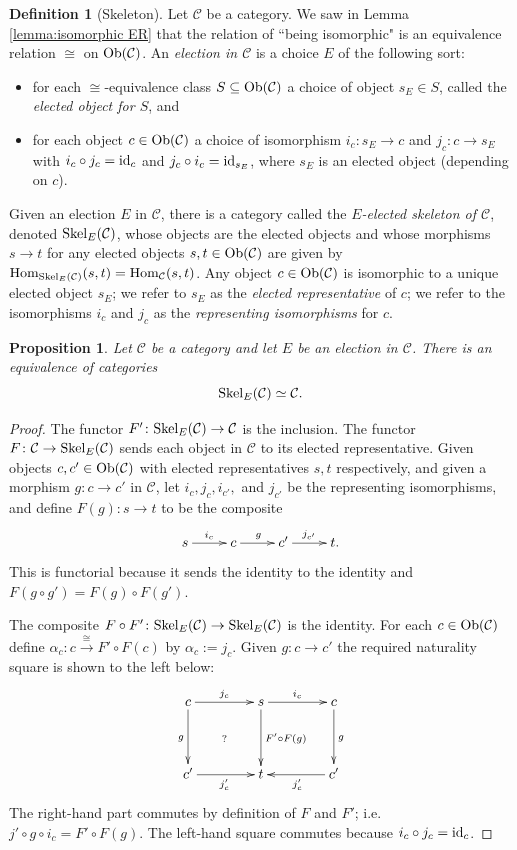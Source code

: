 \documentclass{book}
\def\tn{\textnormal}
\def\mc{\mathcal}
\def\Hom{\tn{Hom}}
\def\Ob{\tn{Ob}}
\def\Skel{\tn{Skel}}
\def\to{\rightarrow}
\def\taking{\colon}
\def\ss{\subseteq}
\def\iso{\cong}
\newcommand{\To}[1]{\xrightarrow{#1}}
\def\id{\tn{id}}
\def\mcC{\mc{C}}
\newtheorem{proposition}[subsubsection]{Proposition}
\theoremstyle{remark}
\theoremstyle{definition}
\newtheorem{definition}[subsubsection]{Definition}
\begin{document}
\begin{definition}[Skeleton]

Let $\mcC$ be a category. We saw in Lemma \ref{lemma:isomorphic ER} that the relation of ``being isomorphic" is an equivalence relation $\cong$ on $\Ob(\mcC)$. An {\em election in $\mcC$} is a choice $E$ of the following sort:
\begin{itemize}
\item for each $\cong$-equivalence class $S\ss\Ob(\mcC)$ a choice of object $s_E\in S$, called the {\em elected object for $S$}, and
\item for each object $c\in\Ob(\mcC)$ a choice of isomorphism $i_c\taking s_E\to c$ and $j_c\taking c\to s_E$ with $i_c\circ j_c=\id_c$ and $j_c\circ i_c=\id_{s_E}$, where $s_E$ is an elected object (depending on $c$).
\end{itemize}
Given an election $E$ in $\mcC$, there is a category called the {\em $E$-elected skeleton of $\mcC$}, denoted $\Skel_E(\mcC)$, whose objects are the elected objects and whose morphisms $s\to t$ for any elected objects $s,t\in\Ob(\mcC)$ are given by $\Hom_{\Skel_E(\mcC)}(s,t)=\Hom_\mcC(s,t)$. Any object $c\in\Ob(\mcC)$ is isomorphic to a unique elected object $s_E$; we refer to $s_E$ as the {\em elected representative} of $c$; we refer to the isomorphisms $i_c$ and $j_c$ as the {\em representing isomorphisms} for $c$.

\end{definition}

\begin{proposition}

Let $\mcC$ be a category and let $E$ be an election in $\mcC$. There is an equivalence of categories $$\Skel_E(\mcC)\simeq\mcC.$$

\end{proposition}

\begin{proof}

The functor $F'\taking\Skel_E(\mcC)\to\mcC$ is the inclusion. The functor $F\taking\mcC\to\Skel_E(\mcC)$ sends each object in $\mcC$ to its elected representative. Given objects $c,c'\in\Ob(\mcC)$ with elected representatives $s,t$ respectively, and given a morphism $g\taking c\to c'$ in $\mcC$, let $i_c,j_c,i_{c'},$ and $j_{c'}$ be the representing isomorphisms, and define $F(g)\taking s\to t$ to be the composite 
$$\xymatrix{s\ar[r]^{i_c}&c\ar[r]^g&c'\ar[r]^{j_{c'}}&t.}$$
This is functorial because it sends the identity to the identity and $F(g\circ g')=F(g)\circ F(g')$.

The composite $F\circ F'\taking\Skel_E(\mcC)\to\Skel_E(\mcC)$ is the identity. For each $c\in\Ob(\mcC)$ define $\alpha_c\taking c\To{\iso} F'\circ F(c)$ by  $\alpha_c:=j_c$. Given $g\taking c\to c'$ the required naturality square is shown to the left below:
$$
\xymatrix@=40pt{
c\ar[r]^{j_c}\ar[d]_{g}\ar@{}[dr]|{?}&s\ar[r]^{i_c}\ar[d]^{F'\circ F(g)}&c\ar[d]^g\\
c'\ar[r]_{j_c'}&t&c'\ar[l]^{j_c'}}
$$
The right-hand part commutes by definition of $F$ and $F'$; i.e. $j'\circ g\circ i_c=F'\circ F(g)$. The left-hand square commutes because $i_c\circ j_c=\id_c$.

\end{proof}
\end{document}

